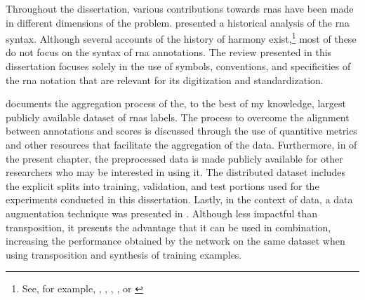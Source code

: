 
Throughout the dissertation, various contributions towards
\glspl{rna} have been made in different dimensions of the
problem. 
presented a historical analysis of the \gls{rna} syntax.
Although several accounts of the history of harmony
exist,\footnote{See, for example,
\textcite{wason1985viennese}, \textcite{grave1988praise},
\textcite{christensen2002tonality},
\textcite{laitz2010graduate}, or
\textcite{sansallovich2013quintas}} most of these do not
focus on the syntax of \gls{rna} annotations. The review
presented in this dissertation focuses solely in the use of
symbols, conventions, and specificities of the \gls{rna}
notation that are relevant for its digitization and
standardization.

 documents the
aggregation process of the, to the best of my knowledge,
largest publicly available dataset of \glspl{rna} labels.
The process to overcome the alignment between annotations
and scores is discussed through the use of quantitive
metrics and other resources that facilitate the aggregation
of the data. Furthermore, in  of
the present chapter, the preprocessed data is made publicly
available for other researchers who may be interested in
using it. The distributed dataset includes the explicit
splits into training, validation, and test portions used for
the experiments conducted in this dissertation. Lastly, in
the context of data, a data augmentation technique was
presented in .
Although less impactful than transposition, it presents the
advantage that it can be used in combination, increasing the
performance obtained by the network on the same dataset when
using transposition and synthesis of training examples.

